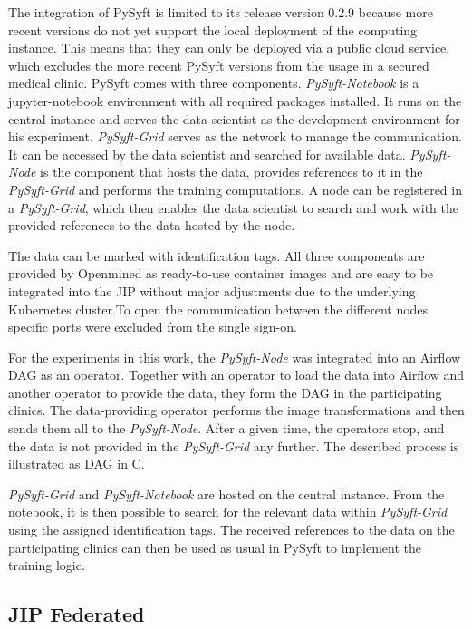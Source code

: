 The integration of PySyft is limited to its release version 0.2.9 because more recent versions do not yet support the local deployment of the computing instance.
This means that they can only be deployed via a public cloud service, which excludes the more recent PySyft versions from the usage in a secured medical clinic.
PySyft comes with three components.
\textit{PySyft-Notebook} is a jupyter-notebook environment with all required packages installed. It runs on the central instance and serves the data scientist as the development environment for his experiment.
\textit{PySyft-Grid} serves as the network to manage the communication. It can be accessed by the data scientist and searched for available data.
\textit{PySyft-Node} is the component that hosts the data, provides references to it in the \textit{PySyft-Grid} and performs the training computations. A node can be registered in a \textit{PySyft-Grid}, which then enables the data scientist to search and work with the provided references to the data hosted by the node.

The data can be marked with identification tags. All three components are provided by Openmined as ready-to-use container images and are easy to be integrated into the JIP without major adjustments due to the underlying Kubernetes cluster.To open the communication between the different nodes specific ports were excluded from the single sign-on.

For the experiments in this work, the \textit{PySyft-Node} was integrated into an Airflow DAG as an operator. Together with an operator to load the data into Airflow and another operator to provide the data, they form the DAG in the participating clinics. The data-providing operator performs the image transformations and then sends them all to the \textit{PySyft-Node}. After a given time, the operators stop, and the data is not provided in the \textit{PySyft-Grid} any further. The described process is illustrated as DAG in  C.

\textit{PySyft-Grid} and \textit{PySyft-Notebook} are hosted on the central instance.
From the notebook, it is then possible to search for the relevant data within \textit{PySyft-Grid} using the assigned identification tags. The received references to the data on the participating clinics can then be used as usual in PySyft to implement the training logic.


\subsection{JIP Federated}
\label{subsec:MethodsJIPFederated}

